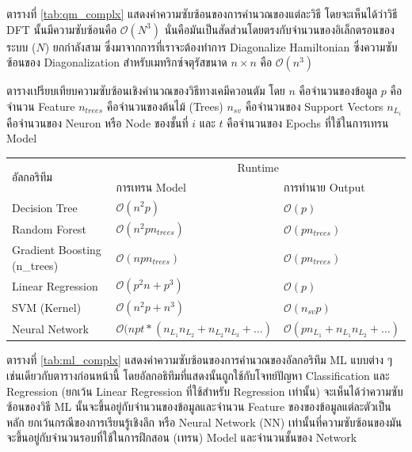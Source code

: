 ตารางที่ \ref{tab:qm_complx} แสดงค่าความซับซ้อนของการคำนวณของแต่ละวิธี โดยจะเห็นได้ว่าวิธี DFT นั้นมีความซับซ้อนคือ $\mathcal{O}(N^{3})$ 
นั่นคือมันเป็นสัดส่วนโดยตรงกับจำนวนของอิเล็กตรอนของระบบ ($N$) ยกกำลังสาม ซึ่งมาจากการที่เราจะต้องทำการ Diagonalize Hamiltonian 
ซึ่งความซับซ้อนของ Diagonalization สำหรับเมทริกซ์จตุรัสขนาด $n \times n$ คือ $\mathcal{O}(n^{3})$

\begin{adjustwidth}{-2.5 cm}{-2.5 cm}
    \centering
    \begin{threeparttable}[!htb]
    \caption{ตารางเปรียบเทียบความซับซ้อนเชิงคำนวณของวิธีทางเคมีควอนตัม\cite{zotero-328} โดย $n$ คือจำนวนของข้อมูล $p$ คือจำนวน Feature
    $n_{trees}$ คือจำนวนของต้นไม้ (Trees) $n_{sv}$ คือจำนวนของ Support Vectors $n_{L_{i}}$ คือจำนวนของ Neuron หรือ Node ของชั้นที่ $i$
    และ $t$ คือจำนวนของ Epochs ที่ใช้ในการเทรน Model}
    \label{tab:ml_complx}
    \small
    \begin{tabular}{lll}\toprule
    \multirow{2}{*}{อัลกอริทึม} &\multicolumn{2}{c}{Runtime} \\\cmidrule{2-3}
    &การเทรน Model &การทำนาย Output \\\midrule
    Decision Tree &$\mathcal{O}(n^{2}p)$ &$\mathcal{O}(p)$ \\
    Random Forest &$\mathcal{O}(n^{2}pn_{trees})$ &$\mathcal{O}(pn_{trees})$ \\
    Gradient Boosting (n\_{trees}) &$\mathcal{O}(npn_{trees})$ &$\mathcal{O}(pn_{trees})$ \\
    Linear Regression &$\mathcal{O}(p^{2}n+p^{3})$ &$\mathcal{O}(p)$ \\
    SVM (Kernel) &$\mathcal{O}(n^{2}p+n^{3})$ &$\mathcal{O}(n_{sv}p)$ \\
    Neural Network &$\mathcal{O}(npt*(n_{L_{1}}n_{L_{2}}+ n_{L_{2}}n_{L_{3}} + \dots)$ &$\mathcal{O}(pn_{L_{1}}+n_{L_{1}}n_{L_{2}}+ \dots)$ \\
    \bottomrule
    \end{tabular}
\end{threeparttable}
\end{adjustwidth}

ตารางที่ \ref{tab:ml_complx} แสดงค่าความซับซ้อนของการคำนวณของอัลกอริทึม ML แบบต่าง ๆ เช่นเดียวกับตารางก่อนหน้านี้ 
โดยอัลกอธิทึมที่แสดงนั้นถูกใช้กับโจทย์ปัญหา Classification และ Regression (ยกเว้น Linear Regression ที่ใช้สำหรับ Regression เท่านั้น)
จะเห็นได้ว่าความซับซ้อนของวิธี ML นั้นจะขึ้นอยู่กับจำนวนของข้อมูลและจำนวน Feature ของของข้อมูลแต่ละตัวเป็นหลัก ยกเว้นกรณีของการเรียนรู้เชิงลึก 
หรือ Neural Network (NN) เท่านั้นที่ความซับซ้อนของมันจะขึ้นอยู่กับจำนวนรอบที่ใช้ในการฝึกสอน (เทรน) Model และจำนวนชั้นของ Network

